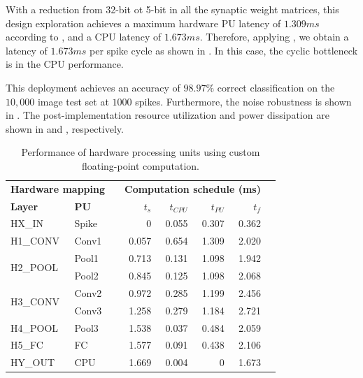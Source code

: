 With a reduction from 32-bit ot 5-bit in all the synaptic weight matrices, this design exploration achieves a maximum hardware PU latency of $1.309 ms$ according to , and a CPU latency of $1.673 ms$. Therefore, applying , we obtain a latency of $1.673 ms$ per spike cycle as shown in . In this case, the cyclic bottleneck is in the CPU performance.

This deployment achieves an accuracy of $98.97\%$ correct classification on the $10,000$ image test set at $1000$ spikes. Furthermore, the noise robustness is shown in . The post-implementation resource utilization and power dissipation are shown in  and , respectively.

\begin{table}[t!]\centering
	\caption{Performance of hardware processing units using custom floating-point computation.}\label{tab:latency_cfp}
	\scriptsize
	\begin{tabular}{llrrrrrr}\toprule
		\multicolumn{2}{c}{\textbf{Hardware mapping}} & &\multicolumn{4}{c}{\textbf{Computation schedule (ms)}} \\\cmidrule{1-2}\cmidrule{4-7}
		\textbf{Layer} &\textbf{PU} & &$t_s$ &$t_{CPU}$ &$t_{PU}$ &$t_f$ \\\midrule
		HX\_IN &Spike & &0 &0.055 &0.307 &0.362 \\
		H1\_CONV &Conv1 & &0.057 &0.654 &1.309 &2.020 \\
		\multirow{2}{*}{H2\_POOL} &Pool1 & &0.713 &0.131 &1.098 &1.942 \\
		&Pool2 & &0.845 &0.125 &1.098 &2.068 \\
		\multirow{2}{*}{H3\_CONV} &Conv2 & &0.972 &0.285 &1.199 &2.456 \\
		&Conv3 & &1.258 &0.279 &1.184 &2.721 \\
		H4\_POOL &Pool3 & &1.538 &0.037 &0.484 &2.059 \\
		H5\_FC &FC & &1.577 &0.091 &0.438 &2.106 \\
		HY\_OUT &CPU & &1.669 &0.004 &0 &1.673 \\
		\bottomrule
	\end{tabular}
\end{table}

